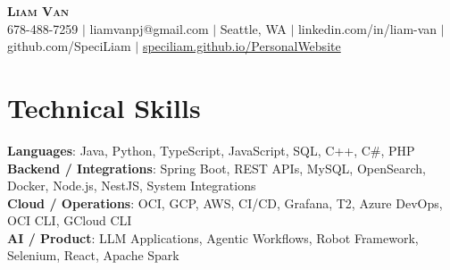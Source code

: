 \documentclass[letterpaper,11pt]{article}
\begin{document}

%
\begin{center}
    \textbf{\Huge \scshape Liam Van} \\ \vspace{1pt}
    \small 678-488-7259 $|$ \small {liamvanpj@gmail.com} $|$ Seattle, WA
 {{$|$ linkedin.com/in/liam-van} {$|$ github.com/SpeciLiam} {$|$ \href{https://speciliam.github.io/PersonalWebsite}{speciliam.github.io/PersonalWebsite}}}

\end{center}

\section{Technical Skills}
 \begin{itemize}[leftmargin=0.15in, label={}]
    \small{\item{
     \textbf{Languages}{: Java, Python, TypeScript, JavaScript, SQL, C++, C\#, PHP} \\
     \textbf{Backend / Integrations}{: Spring Boot, REST APIs, MySQL, OpenSearch, Docker, Node.js, NestJS, System Integrations} \\
     \textbf{Cloud / Operations}{: OCI, GCP, AWS, CI/CD, Grafana, T2, Azure DevOps, OCI CLI, GCloud CLI} \\
     \textbf{AI / Product}{: LLM Applications, Agentic Workflows, Robot Framework, Selenium, React, Apache Spark} \\
    }}
 \end{itemize}
%
\end{document}
